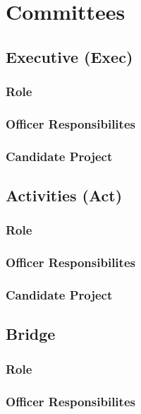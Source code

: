 \documentclass[11pt, article, oneside]{memoir}
\begin{document}

    \newpage
    \chapter{Committees}
    \section{Executive (Exec)}
    \subsection{Role}

    \subsection{Officer Responsibilites}

    \subsection{Candidate Project}

    \bigbreak



    \section{Activities (Act)}
    \subsection{Role}

    \subsection{Officer Responsibilites}

    \subsection{Candidate Project}

    \section{Bridge}
    \subsection{Role}

    \subsection{Officer Responsibilites}
\end{document}
